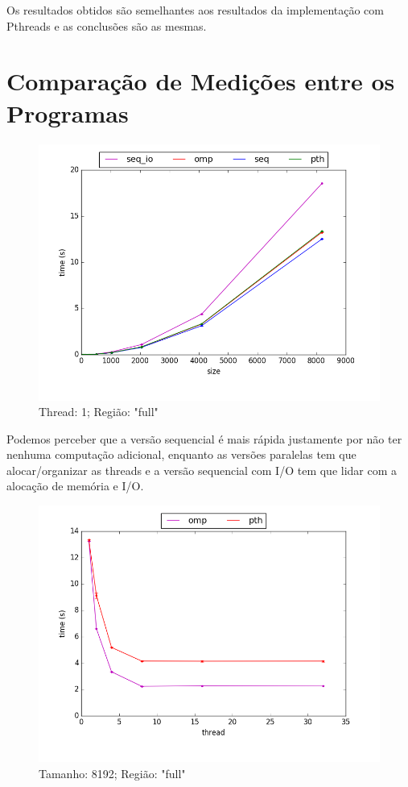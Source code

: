\documentclass[final,12pt,a4paper]{elsarticle}
\begin{document}
Os resultados obtidos são semelhantes aos resultados da implementação com Pthreads e as conclusões são as mesmas.

\section{Comparação de Medições entre os Programas}

\begin{figure}[!htpb]
    \centering
    \includegraphics[width=.8\textwidth]{image8}
    \caption{Thread: 1; Região: "full"}
    \label{fig:image8}
\end{figure} 

Podemos perceber que a versão sequencial é mais rápida justamente por não ter nenhuma computação adicional, enquanto as versões paralelas tem que alocar/organizar as threads e a versão sequencial com I/O tem que lidar com a alocação de memória e I/O.

\begin{figure}[htpb]
    \centering
    \includegraphics[width=.9\textwidth]{image9}
    \caption{Tamanho: 8192; Região: "full"}
    \label{fig:image9}
\end{figure} 
\end{document}
